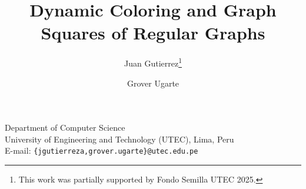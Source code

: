 \documentclass[a4paper,11pt]{article}
\theoremstyle{case}
\numberwithin{subcase}{case}
\begin{document}
\title{Dynamic Coloring and Graph Squares of Regular Graphs}


\author{
Juan Gutierrez\thanks{This work was partially supported by Fondo Semilla UTEC 2025.}
\and
Grover Ugarte\footnotemark[1]
}
\date{}
\maketitle

\begin{center}
\footnotesize
Department of Computer Science\\
University of Engineering and Technology (UTEC), Lima, Peru\\
E-mail: \texttt{\{jgutierreza,grover.ugarte\}@utec.edu.pe}
\end{center}










\newpage



\end{document}
